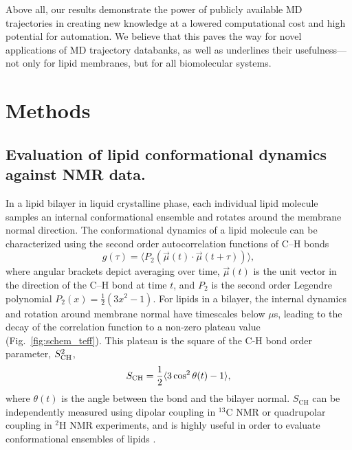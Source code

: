 \documentclass[journal=jcisd8,manuscript=article,layout=twocolumn]{achemso}
\begin{document}
Above all, our results demonstrate the power of publicly available MD trajectories
in creating new knowledge at a lowered computational cost and high potential for automation.  
We believe that this paves the way for novel applications of MD trajectory
databanks, as well as underlines their usefulness---not only for lipid membranes,
but for all biomolecular systems.


\clearpage
\section{Methods}
\subsection*{Evaluation of lipid conformational dynamics against NMR data.}\label{sec:theory}
In a lipid bilayer in liquid crystalline phase, each individual lipid molecule samples an internal conformational
ensemble and rotates around
the membrane normal direction.
The conformational dynamics of a lipid molecule can be characterized using
the second order autocorrelation functions of C--H bonds %
\begin{equation}
\label{eq:BCF}
g(\tau)=\langle P_{2}\left(\vec{\mu}(t)\cdot \vec{\mu}(t+\tau)\right)\rangle ,
\end{equation}
where angular brackets depict averaging over time,
$\vec{\mu}(t)$ is the unit vector in the direction of the C--H bond at time $t$, and $P_{2}$ is the second order Legendre polynomial $P_2(x)=\frac{1}{2}(3x^2-1)$.
For lipids in a bilayer, the internal dynamics and rotation around membrane normal
have timescales below $\mu$s, leading to the decay of the correlation function to a non-zero plateau value (Fig.~\ref{fig:schem_teff}).
This plateau is the square of the C-H bond order parameter, $S^{2}_{\rm{CH}}$, 
\begin{equation}
\label{eq:OP}
S_{\rm{CH}}=\frac{1}{2}\langle 3\cos^{2}\theta(t)-1\rangle ,
\end{equation}
where $\theta(t)$ is the angle between the bond and the bilayer normal.
$S_\mathrm{CH}$ can be independently measured using dipolar coupling in $^{13}$C NMR or quadrupolar coupling in $^{2}$H NMR experiments,
and is highly useful in order to evaluate conformational ensembles of lipids \cite{Ollila:2016a}.
\end{document}
